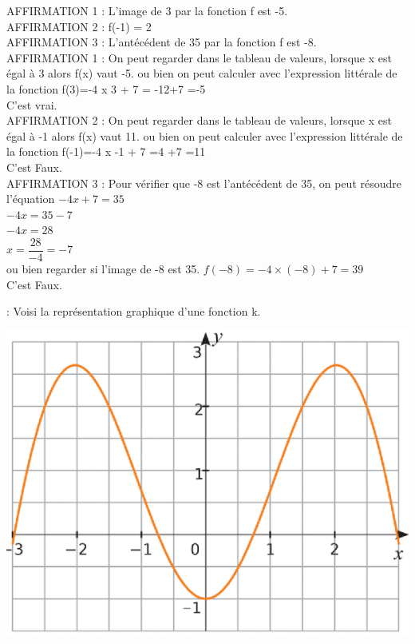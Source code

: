 \documentclass[a4paper,11pt]{article}
\newcounter{numexo}
\newcommand{\exo}[1]{\stepcounter{numexo}\noindent{\bf Exercice~\thenumexo} : \marginpar{\hfill /#1}}
\begin{document}
AFFIRMATION 1 : L'image de 3 par la fonction f est -5.\\

AFFIRMATION 2 : f(-1) = 2\\

AFFIRMATION 3 : L'antécédent de 35 par la fonction f est -8.\\


\color{red}
AFFIRMATION 1 : On peut regarder dans le tableau de valeurs, lorsque x est égal à 3 alors f(x) vaut -5. 
ou bien on peut calculer avec l'expression littérale de la fonction f(3)=-4 x 3 + 7 = -12+7 =-5\\
C'est vrai.\\


AFFIRMATION 2 : On peut regarder dans le tableau de valeurs, lorsque x est égal à -1 alors f(x) vaut 11. 
ou bien on peut calculer avec l'expression littérale de la fonction f(-1)=-4 x -1 + 7 =4 +7 =11\\
C'est Faux.\\

AFFIRMATION 3 : Pour vérifier que -8 est l'antécédent  de 35, on peut résoudre l'équation $-4x+7=35$\\

$-4x=35-7$\\
$-4x=28$\\
$x=\dfrac{28}{-4}=-7$\\

ou bien regarder si l'image de -8 est 35. $f(-8)=-4 \times (-8) +7 = 39$\\

C'est Faux.


\color{black}

\newpage

\exo{3} Voisi la représentation graphique d'une fonction k.

\begin{center}
\includegraphics[scale=1]{fonction.eps} 
\end{center}
\end{document}
